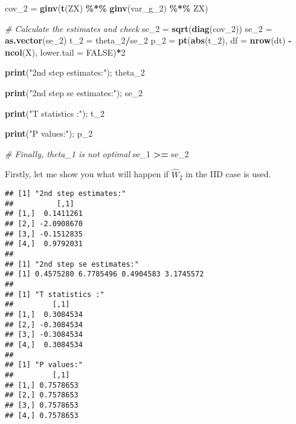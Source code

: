 \documentclass[
  12pt,
]{article}
\newenvironment{Shaded}{\begin{snugshade}}{\end{snugshade}}
\newcommand{\CommentTok}[1]{\textcolor[rgb]{0.56,0.35,0.01}{\textit{#1}}}
\newcommand{\DataTypeTok}[1]{\textcolor[rgb]{0.13,0.29,0.53}{#1}}
\newcommand{\DecValTok}[1]{\textcolor[rgb]{0.00,0.00,0.81}{#1}}
\newcommand{\KeywordTok}[1]{\textcolor[rgb]{0.13,0.29,0.53}{\textbf{#1}}}
\newcommand{\NormalTok}[1]{#1}
\newcommand{\OperatorTok}[1]{\textcolor[rgb]{0.81,0.36,0.00}{\textbf{#1}}}
\newcommand{\OtherTok}[1]{\textcolor[rgb]{0.56,0.35,0.01}{#1}}
\newcommand{\StringTok}[1]{\textcolor[rgb]{0.31,0.60,0.02}{#1}}
\begin{document}
\begin{Shaded}
\begin{Highlighting}[]
\NormalTok{cov\_}\DecValTok{2}\NormalTok{   =}\StringTok{ }\KeywordTok{ginv}\NormalTok{(}\KeywordTok{t}\NormalTok{(ZX) }\OperatorTok{\%*\%}\StringTok{ }\KeywordTok{ginv}\NormalTok{(var\_g\_}\DecValTok{2}\NormalTok{) }\OperatorTok{\%*\%}\StringTok{ }\NormalTok{ZX) }


\CommentTok{\# Calculate the estimates and check}
\NormalTok{se\_}\DecValTok{2}\NormalTok{  =}\StringTok{ }\KeywordTok{sqrt}\NormalTok{(}\KeywordTok{diag}\NormalTok{(cov\_}\DecValTok{2}\NormalTok{))}
\NormalTok{se\_}\DecValTok{2}\NormalTok{  =}\StringTok{ }\KeywordTok{as.vector}\NormalTok{(se\_}\DecValTok{2}\NormalTok{)}
\NormalTok{t\_}\DecValTok{2}\NormalTok{   =}\StringTok{ }\NormalTok{theta\_}\DecValTok{2}\OperatorTok{/}\NormalTok{se\_}\DecValTok{2}
\NormalTok{p\_}\DecValTok{2}\NormalTok{   =}\StringTok{ }\KeywordTok{pt}\NormalTok{(}\KeywordTok{abs}\NormalTok{(t\_}\DecValTok{2}\NormalTok{), }\DataTypeTok{df =} \KeywordTok{nrow}\NormalTok{(dt) }\OperatorTok{{-}}\StringTok{ }\KeywordTok{ncol}\NormalTok{(X), }\DataTypeTok{lower.tail =} \OtherTok{FALSE}\NormalTok{)}\OperatorTok{*}\DecValTok{2}

\KeywordTok{print}\NormalTok{(}\StringTok{"2nd step estimates:"}\NormalTok{); theta\_}\DecValTok{2}

\KeywordTok{print}\NormalTok{(}\StringTok{"2nd step se estimates:"}\NormalTok{); se\_}\DecValTok{2}

\KeywordTok{print}\NormalTok{(}\StringTok{"T statistics :"}\NormalTok{); t\_}\DecValTok{2}

\KeywordTok{print}\NormalTok{(}\StringTok{"P values:"}\NormalTok{); p\_}\DecValTok{2}

\CommentTok{\# Finally, theta\_1 is not optimal}
\NormalTok{se\_}\DecValTok{1} \OperatorTok{\textgreater{}=}\StringTok{ }\NormalTok{se\_}\DecValTok{2}
\end{Highlighting}
\end{Shaded}

Firstly, let me show you what will happen if \(\widehat{W}_2\) in the \color{blue} IID case \color{black} is used.

\begin{verbatim}
## [1] "2nd step estimates:"
##          [,1]
## [1,]  0.1411261
## [2,] -2.0908670
## [3,] -0.1512835
## [4,]  0.9792031
##
## [1] "2nd step se estimates:"
## [1] 0.4575280 6.7785496 0.4904583 3.1745572
##
## [1] "T statistics :"
##         [,1]
## [1,]  0.3084534
## [2,] -0.3084534
## [3,] -0.3084534
## [4,]  0.3084534
##
## [1] "P values:"
##         [,1]
## [1,] 0.7578653
## [2,] 0.7578653
## [3,] 0.7578653
## [4,] 0.7578653
\end{verbatim}
\end{document}
